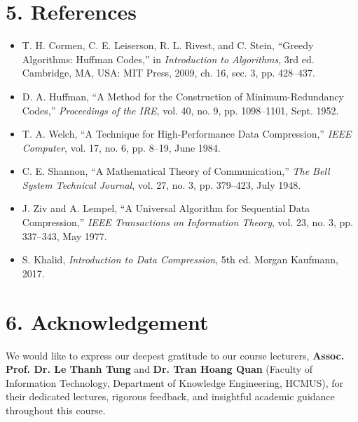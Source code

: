 \documentclass{article}
\begin{document}
\section*{5. References}
\setcounter{section}{5}
\setcounter{subsection}{0}
\setcounter{subsubsection}{0}

\begin{itemize}
    \item[\textbf{[1]}] T. H. Cormen, C. E. Leiserson, R. L. Rivest, and C. Stein, ``Greedy Algorithms: Huffman Codes,'' in \emph{Introduction to Algorithms}, 3rd ed. Cambridge, MA, USA: MIT Press, 2009, ch. 16, sec. 3, pp. 428--437.
    \item[\textbf{[2]}] D. A. Huffman, ``A Method for the Construction of Minimum-Redundancy Codes,'' \emph{Proceedings of the IRE}, vol. 40, no. 9, pp. 1098--1101, Sept. 1952.
    \item[\textbf{[3]}] T. A. Welch, ``A Technique for High-Performance Data Compression,'' \emph{IEEE Computer}, vol. 17, no. 6, pp. 8--19, June 1984.
    \item[\textbf{[4]}] C. E. Shannon, ``A Mathematical Theory of Communication,'' \emph{The Bell System Technical Journal}, vol. 27, no. 3, pp. 379--423, July 1948.
    \item[\textbf{[5]}] J. Ziv and A. Lempel, ``A Universal Algorithm for Sequential Data Compression,'' \emph{IEEE Transactions on Information Theory}, vol. 23, no. 3, pp. 337--343, May 1977.
    \item[\textbf{[6]}] S. Khalid, \emph{Introduction to Data Compression}, 5th ed. Morgan Kaufmann, 2017.
\end{itemize}

\cleardoublepage
\newpage

\section*{6. Acknowledgement}
\setcounter{section}{6}
\setcounter{subsection}{0}
\setcounter{subsubsection}{0}

We would like to express our deepest gratitude to our course lecturers, \textbf{Assoc. Prof. Dr. Le Thanh Tung} and \textbf{Dr. Tran Hoang Quan} (Faculty of Information Technology, Department of Knowledge Engineering, HCMUS), for their dedicated lectures, rigorous feedback, and insightful academic guidance throughout this course.
\end{document}
